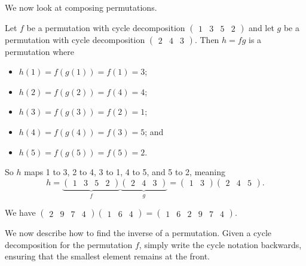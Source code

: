 We now look at composing permutations.
\begin{example}
    Let $f$ be a permutation with cycle decomposition $\begin{pmatrix}1 & 3 & 5 & 2\end{pmatrix}$ and let $g$ be a permutation with cycle decomposition $\begin{pmatrix}2 & 4 & 3\end{pmatrix}$. Then $h = fg$ is a permutation where
    \begin{itemize}
        \item $h(1) = f(g(1)) = f(1) = 3$;
        \item $h(2) = f(g(2)) = f(4) = 4$;
        \item $h(3) = f(g(3)) = f(2) = 1$;
        \item $h(4) = f(g(4)) = f(3) = 5$; and
        \item $h(5) = f(g(5)) = f(5) = 2$.
    \end{itemize}

    So $h$ maps 1 to 3, 2 to 4, 3 to 1, 4 to 5, and 5 to 2, meaning
    \[
        h = \underbrace{\begin{pmatrix}1 & 3 & 5 & 2\end{pmatrix}}_{f}\underbrace{\begin{pmatrix}2 & 4 & 3\end{pmatrix}}_{g} = \begin{pmatrix}1 & 3\end{pmatrix}\begin{pmatrix}2 & 4 & 5\end{pmatrix}.
    \]
\end{example}

\begin{example}
    We have $ \begin{pmatrix}2 & 9 & 7 & 4\end{pmatrix}\begin{pmatrix}1 & 6 & 4\end{pmatrix} = \begin{pmatrix}1 & 6 & 2 & 9 & 7 & 4\end{pmatrix}$.
\end{example}

We now describe how to find the inverse of a permutation. Given a cycle decomposition for the permutation $f$, simply write the cycle notation backwards, ensuring that the smallest element remains at the front.

